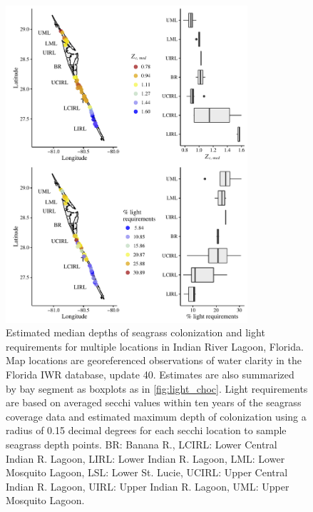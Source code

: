 \documentclass[letterpaper,12pt,oneside]{article}\usepackage[]{graphicx}\usepackage[]{color}
\newcommand{\beginsupplement}{%
        \setcounter{table}{0}
        \renewcommand{\thetable}{S\arabic{table}}%
        \setcounter{figure}{0}
        \renewcommand{\thefigure}{S\arabic{figure}}%
     }
\begin{document}
\begin{figure}
\centering
\includegraphics[width = 0.8\textwidth]{figs/Fig9.pdf}
\caption{Estimated median depths of seagrass colonization and light requirements for multiple locations in Indian River Lagoon, Florida.  Map locations are georeferenced observations of water clarity in the Florida \acl{IWR} database, update 40.  Estimates are also summarized by bay segment as boxplots as in \cref{fig:light_choc}. Light requirements are based on averaged secchi values within ten years of the seagrass coverage data and estimated maximum depth of colonization using a radius of 0.15 decimal degrees for each secchi location to sample seagrass depth points. BR: Banana R., LCIRL: Lower Central Indian R. Lagoon, LIRL: Lower Indian R. Lagoon, LML: Lower Mosquito Lagoon, LSL: Lower St. Lucie, UCIRL: Upper Central Indian R. Lagoon, UIRL: Upper Indian R. Lagoon, UML: Upper Mosquito Lagoon.}
\label{fig:light_irl}
\end{figure}
\clearpage

\beginsupplement

\end{document}
